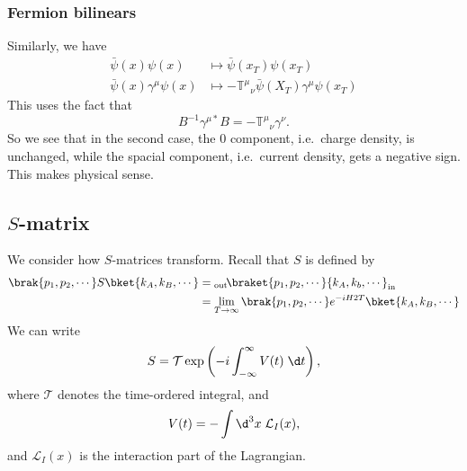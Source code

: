 \documentclass[a4paper]{article}
\begin{document}
\subsubsection*{Fermion bilinears}
Similarly, we have
\begin{align*}
  \bar\psi (x) \psi(x) &\mapsto \bar\psi(x_T) \psi(x_T)\\
  \bar\psi(x) \gamma^\mu \psi(x) &\mapsto -\mathbb{T}^\mu\!_\nu \bar\psi(X_T) \gamma^\mu \psi(x_T)
\end{align*}
This uses the fact that
\[
  B^{-1} \gamma^{\mu*}B = - \mathbb{T}^\mu\!_\nu \gamma^\nu.
\]
So we see that in the second case, the $0$ component, i.e.\ charge density, is unchanged, while the spacial component, i.e.\ current density, gets a negative sign. This makes physical sense.

\subsection{\texorpdfstring{$S$}{S}-matrix}
We consider how $S$-matrices transform. Recall that $S$ is defined by
\begin{align*}
  \brak{p_1, p_2, \cdots} S \bket{k_A, k_B, \cdots} &={} _{\mathrm{out}}\!\braket{p_1, p_2, \cdots}{k_A, k_b, \cdots}_{\mathrm{in}} \\
  &= \lim_{T \to \infty} \brak{p_1, p_2, \cdots} e^{-iH2T} \bket{k_A, k_B, \cdots}
\end{align*}
We can write
\[
  S = \mathcal{T} \exp\left(-i \int_{-\infty}^\infty V(t) \;\d t\right),
\]
where $\mathcal{T}$ denotes the time-ordered integral, and
\[
  V(t) = -\int \d^3 x\; \mathcal{L}_I(x),
\]
and $\mathcal{L}_I(x)$ is the interaction part of the Lagrangian.
\end{document}
